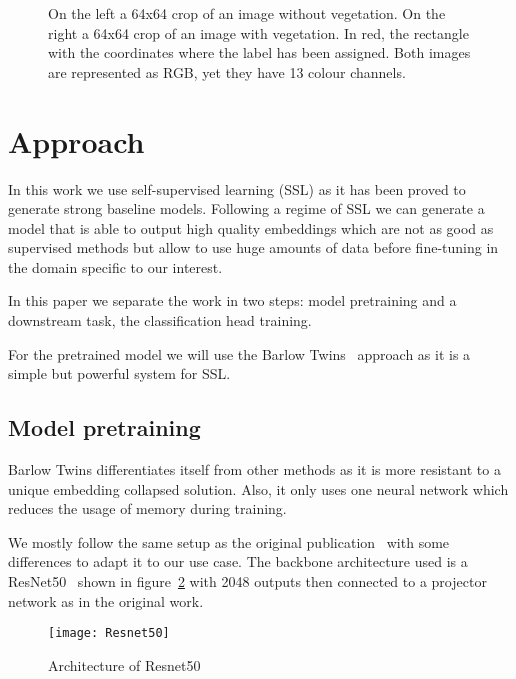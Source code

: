 \documentclass[conference]{IEEEtran}
\begin{document}
    \begin{figure}[h]
        \centering
        \qquad
        \caption{On the left a 64x64 crop of an image without vegetation. On the right a 64x64 crop of an image with vegetation.
        In red, the rectangle with the coordinates where the label has been assigned.
        Both images are represented as RGB, yet they have 13 colour channels.}
        \label{fig:vegetation_example}
    \end{figure}


    \section{Approach}
    In this work we use self-supervised learning (SSL) as it has been proved to generate strong baseline models.
    Following a regime of SSL we can generate a model that is able to output high quality embeddings which are not
    as good as supervised methods but allow to use huge amounts of data before fine-tuning in the domain specific to our interest.

    In this paper we separate the work in two steps: model pretraining and a downstream task, the classification head training.

    For the pretrained model we will use the Barlow Twins~\cite{barlowtwins} approach as it is a simple but powerful system for
    SSL.

    \subsection{Model pretraining}
    Barlow Twins differentiates itself from other methods as it is more resistant to a unique embedding collapsed solution.
    Also, it only uses one neural network which reduces the usage of memory during training.

    We mostly follow the same setup as the original publication~\cite{barlowtwins} with some differences to adapt it to our use case.
    The backbone architecture used is a ResNet50~\cite{he2015deep} shown in figure~\ref{fig:resnet50} with 2048 outputs then connected to a projector network as in the original work.

    \begin{figure}
        \centering
        \texttt{[image: Resnet50]}
        \caption{Architecture of Resnet50}
        \label{fig:resnet50}
    \end{figure}
\end{document}
